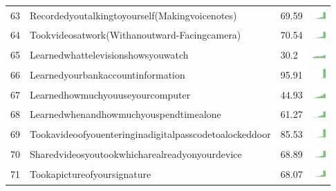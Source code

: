 \begin{table}[t]
\begin{center}
\begin{tabular}{| p{0.5cm} | p{7cm} | p{1cm} | c |}
63 & Recordedyoutalkingtoyourself(Makingvoicenotes) & 69.59 & \includegraphics[width = 0.5cm, height = 0.5cm]{../recordedyoutalkingtoyourself(makingvoicenotes)combined} \\ 
64 & Tookvideosatwork(Withanoutward-Facingcamera) & 70.54 & \includegraphics[width = 0.5cm, height = 0.5cm]{../tookvideosatwork(withanoutward-facingcamera)combined} \\ 
65 & Learnedwhattelevisionshowsyouwatch & 30.2 & \includegraphics[width = 0.5cm, height = 0.5cm]{../learnedwhattelevisionshowsyouwatchcombined} \\ 
66 & Learnedyourbankaccountinformation & 95.91 & \includegraphics[width = 0.5cm, height = 0.5cm]{../learnedyourbankaccountinformationcombined} \\ 
67 & Learnedhowmuchyouuseyourcomputer & 44.93 & \includegraphics[width = 0.5cm, height = 0.5cm]{../learnedhowmuchyouuseyourcomputercombined} \\ 
68 & Learnedwhenandhowmuchyouspendtimealone & 61.27 & \includegraphics[width = 0.5cm, height = 0.5cm]{../learnedwhenandhowmuchyouspendtimealonecombined} \\ 
69 & Tookavideoofyouenteringinadigitalpasscodetoalockeddoor & 85.53 & \includegraphics[width = 0.5cm, height = 0.5cm]{../tookavideoofyouenteringinadigitalpasscodetoalockeddoorcombined} \\ 
70 & Sharedvideosyoutookwhicharealreadyonyourdevice & 68.89 & \includegraphics[width = 0.5cm, height = 0.5cm]{../sharedvideosyoutookwhicharealreadyonyourdevicecombined} \\ 
71 & Tookapictureofyoursignature & 68.07 & \includegraphics[width = 0.5cm, height = 0.5cm]{../tookapictureofyoursignaturecombined} \\ 

\end{tabular}
\end{center}
\end{table}
